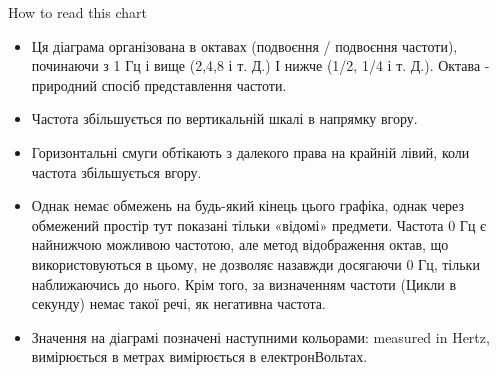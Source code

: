 {
{\Large How to read this chart}
\begin{itemize}

\item Ця діаграма організована в октавах (подвоєння / подвоєння частоти), починаючи з 1 Гц і вище (2,4,8 і т. Д.) І нижче (1/2, 1/4 і т. Д.). Октава - природний спосіб представлення частоти.

\item Частота збільшується по вертикальній шкалі в напрямку вгору.

\item Горизонтальні смуги обтікають з далекого права на крайній лівий, коли частота збільшується вгору.


\item Однак немає обмежень на будь-який кінець цього графіка, однак через обмежений простір тут показані тільки «відомі» предмети. Частота 0 Гц є найнижчою можливою частотою, але метод відображення октав, що використовуються в цьому, не дозволяє назавжди досягаючи 0 Гц, тільки наближаючись до нього. Крім того, за визначенням частоти (Цикли в секунду) немає такої речі, як негативна частота.

\item Значення на діаграмі позначені наступними кольорами: \psframebox[framesep=1pt,fillstyle=solid,fillcolor=Black]{\textcolor{FColor}{Frequency}}  measured in Hertz, \psframebox[framesep=1pt,fillstyle=solid,fillcolor=Black]{\textcolor{WColor}{Wavelength}} вимірюється в метрах \psframebox[framesep=1pt,fillstyle=solid,fillcolor=Black]{\textcolor{EColor}{Energy}} вимірюється в електронВольтах.

\end{itemize}
}
